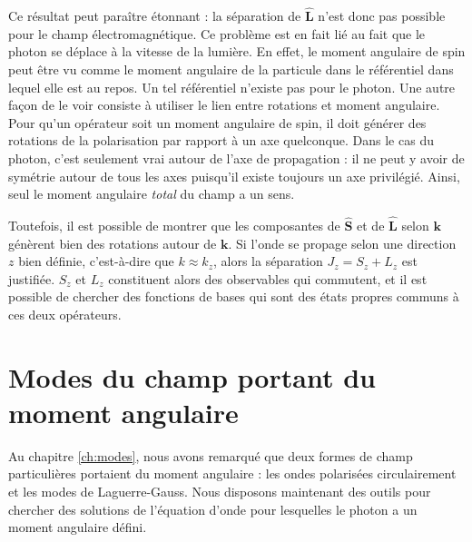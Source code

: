 Ce résultat peut paraître étonnant : la séparation de $\hat{\bm{L}}$ n'est donc pas possible pour le champ électromagnétique. Ce problème est en fait lié au fait que le photon se déplace à la vitesse de la lumière. En effet, le moment angulaire de spin peut être vu comme le moment angulaire de la particule dans le référentiel dans lequel elle est au repos. Un tel référentiel n'existe pas pour le photon. Une autre façon de le voir consiste à utiliser le lien entre rotations et moment angulaire. Pour qu'un opérateur soit un moment angulaire de spin, il doit générer des rotations de la polarisation par rapport à un axe quelconque. Dans le cas du photon, c'est seulement vrai autour de l'axe de propagation : il ne peut y avoir de symétrie autour de tous les axes puisqu'il existe toujours un axe privilégié. Ainsi, seul le moment angulaire \textit{total} du champ a un sens.

Toutefois, il est possible de montrer  que les composantes de $\hat{\bm{S}}$ et de $\hat{\bm{L}}$ selon $\bm{k}$ génèrent bien des rotations autour de $\bm{k}$. Si l'onde se propage selon une direction $z$ bien définie, c'est-à-dire que $k\approx k_z$, alors la séparation $J_z = S_z + L_z$ est justifiée. $S_z$ et $L_z$ constituent alors des observables qui commutent, et il est possible de chercher des fonctions de bases qui sont des états propres communs à ces deux opérateurs.

\chapter{Modes du champ portant du moment angulaire}
Au chapitre \ref{ch:modes}, nous avons remarqué que deux formes de champ particulières portaient du moment angulaire : les ondes polarisées circulairement et les modes de Laguerre-Gauss. Nous disposons maintenant des outils pour chercher des solutions de l'équation d'onde pour lesquelles le photon a un moment angulaire défini.

